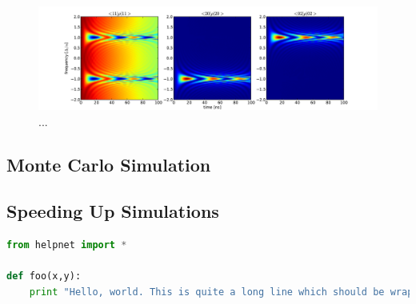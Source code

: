 \begin{figure}[ht!]
	\centering
	\includegraphics[width=\textwidth]{"./material/figures/appendix/modeling/master equation/swap_11_02_20/swap_11_02_20"}
	\caption[...]{...}
	\label{fig:master_equation_simulation_swap_11_02_20}
\end{figure}

\subsection{Monte Carlo Simulation}


\subsection{Speeding Up Simulations}


\begin{lstlisting}[language=python]
from helpnet import *

def foo(x,y):
	print "Hello, world. This is quite a long line which should be wrapped I guess. The sum x + y = %g" % (x,y)
\end{lstlisting}
